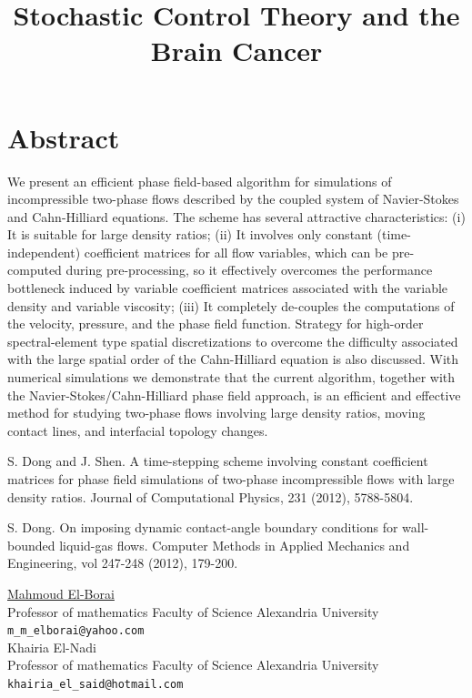 \documentclass[article, A4, 11pt]{llncs}%
\begin{document}
\section*{Abstract}
We present an efficient phase field-based  algorithm for simulations of incompressible two-phase flows described by the coupled system of  Navier-Stokes and Cahn-Hilliard equations. 
The scheme has several attractive characteristics: 
(i) It is suitable for large density ratios; 
(ii) It involves only constant (time-independent) 
coefficient matrices for all flow variables, 
which can be pre-computed during pre-processing, 
so it effectively overcomes the performance 
bottleneck induced by variable coefficient matrices associated with the variable density and
variable viscosity; 
(iii) It  completely de-couples 
the computations of the velocity, pressure, 
and the phase field function. 
Strategy for high-order spectral-element type spatial discretizations to overcome the difficulty associated with the large spatial 
order of the Cahn-Hilliard equation 
is also discussed. 
With numerical simulations we demonstrate that 
the current algorithm, together 
with the Navier-Stokes/Cahn-Hilliard phase field 
approach, is an efficient and effective method 
for studying two-phase flows 
involving large density ratios, moving contact 
lines, and interfacial topology changes. 



\begin{thebibliography}{10}
{\sc S. Dong and J. Shen}. {A time-stepping scheme involving constant coefficient matrices for phase field simulations of two-phase incompressible flows with large density ratios}. Journal of Computational Physics, 231 (2012), 5788-5804.

{\sc S. Dong}. {On imposing dynamic contact-angle boundary conditions for wall-bounded liquid-gas flows}. Computer Methods in Applied Mechanics and Engineering, vol 247-248 (2012), 179-200.
\end{thebibliography} %

\title{Stochastic Control Theory and the Brain Cancer}
 \author{} \institute{}
\maketitle
\begin{center}
{\large \underline{Mahmoud El-Borai}}\\
Professor of mathematics Faculty of Science Alexandria University\\
{\tt \tt m\_m\_elborai@yahoo.com}
\\ \vspace{4mm}
{\large Khairia El-Nadi}\\
Professor of mathematics Faculty of Science Alexandria University\\
{\tt \tt khairia\_el\_said@hotmail.com}
\end{center}
\end{document}
